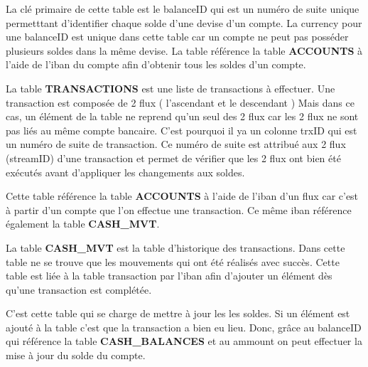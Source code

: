 \documentclass[../rapport.tex]{subfiles}
\begin{document}
	\medskip

	La clé primaire de cette table est le balanceID qui est un numéro de suite 
	unique permetttant d'identifier chaque solde d'une devise d'un compte. 
	La currency pour une balanceID est unique dans cette table car un compte
	ne peut pas posséder plusieurs soldes dans la même devise. La table référence
	la table \textbf{ACCOUNTS} à l'aide de l'iban du compte afin d'obtenir tous les
	soldes d'un compte.

	\bigskip

	La table \textbf{TRANSACTIONS} est une liste de transactions à effectuer. Une 
	transaction est composée de 2 flux ( l'ascendant et le descendant ) Mais dans 
	ce cas, un élément de la table ne reprend qu'un seul des 2 flux car les 2 
	flux ne sont pas liés au même compte bancaire. C'est pourquoi il ya un colonne 
	trxID qui est un numéro de suite de transaction. Ce numéro de suite est attribué
	aux 2 flux (streamID) d'une transaction et permet de vérifier que les 2 flux 
	ont bien été exécutés avant d'appliquer les changements aux soldes. 

	\medskip

	Cette table référence la table \textbf{ACCOUNTS} à l'aide de l'iban d'un flux 
	car c'est à partir d'un compte que l'on effectue une transaction. Ce même iban
	référence également la table \textbf{CASH\_MVT}.

	\bigskip

	La table \textbf{CASH\_MVT} est la table d'historique des transactions. Dans 
	cette table ne se trouve que les mouvements qui ont été réalisés avec succès.
	Cette table est liée à la table transaction par l'iban afin d'ajouter un 
	élément dès qu'une transaction est complétée. 

	\medskip

	C'est cette table qui se charge de mettre à jour les les soldes. Si un élément 
	est ajouté à la table c'est que la transaction a bien eu lieu. Donc, grâce au 
	balanceID qui référence la table \textbf{CASH\_BALANCES} et au ammount on peut
	effectuer la mise à jour du solde du compte.
\end{document}
